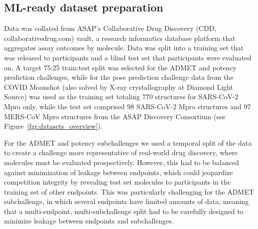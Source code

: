 \documentclass[journal=jcim,manuscript=article]{achemso}
\begin{document}
{\subsection{ML-ready dataset preparation}

Data was collated from ASAP’s Collaborative Drug Discovery (CDD, collaborativedrug.com) vault, a research informatics database platform that aggregates assay outcomes by molecule. Data was split into a training set that was released to participants and a blind test set that participants were evaluated on. A target 75:25 train:test split was selected for the ADMET and potency prediction challenges, while for the pose prediction challenge data from the COVID Moonshot\cite{boby_2023} (also solved by X-ray crystallography at Diamond Light Source) was used as the training set totaling 770 structures for SARS-CoV-2 Mpro only, while the test set comprised 98 SARS-CoV-2 Mpro structures and 97 MERS-CoV Mpro structures from the ASAP Discovery Consortium (see Figure~\ref{fgr:datasets_overview}).  

For the ADMET and potency subchallenges we used a temporal split of the data to create a challenge more representative of real-world drug discovery, where molecules must be evaluated prospectively\cite{sheridan_time-split_2013}. However, this had to be balanced against minimization of leakage between endpoints, which could jeopardize competition integrity by revealing test set molecules to participants in the training set of other endpoints. This was particularly challenging for the ADMET subchallenge, in which several endpoints have limited amounts of data, meaning that a multi-endpoint, multi-subchallenge split had to be carefully designed to minimize leakage between endpoints and subchallenges. 

}
\end{document}
